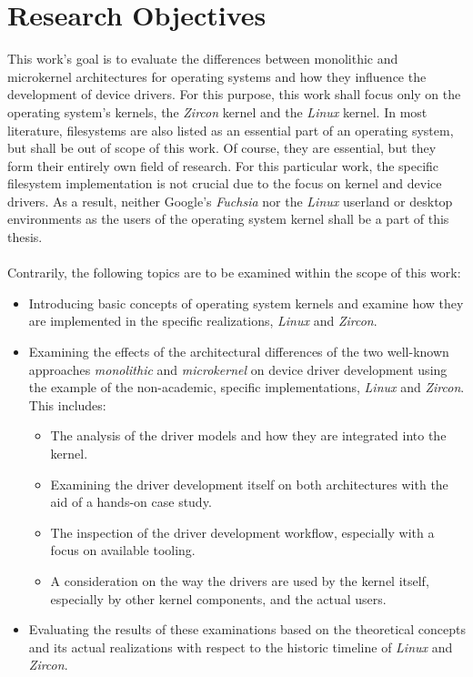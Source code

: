 \section{Research Objectives}\label{sec:research-objectives}
This work's goal is to evaluate the differences between monolithic and microkernel architectures for operating systems and how they influence the development of device drivers.
For this purpose, this work shall focus only on the operating system's kernels, the \textit{Zircon} kernel and the \textit{Linux} kernel.
In most literature, filesystems are also listed as an essential part of an operating system, but shall be out of scope of this work.
Of course, they are essential, but they form their entirely own field of research.
For this particular work, the specific filesystem implementation is not crucial due to the focus on kernel and device drivers.
As a result, neither Google's \textit{Fuchsia} nor the \textit{Linux} userland or desktop environments as the users of the operating system kernel shall be a part of this thesis.\\
\\
Contrarily, the following topics are to be examined within the scope of this work:
\begin{itemize}
    \item Introducing basic concepts of operating system kernels and examine how they are implemented in the specific realizations, \textit{Linux} and \textit{Zircon}.
    \item Examining the effects of the architectural differences of the two well-known approaches \textit{monolithic} and \textit{microkernel} on device driver development using the example of the non-academic, specific implementations, \textit{Linux} and \textit{Zircon}. This includes:  
        \begin{itemize}
            \item The analysis of the driver models and how they are integrated into the kernel.
            \item Examining the driver development itself on both architectures with the aid of a hands-on case study.
            \item The inspection of the driver development workflow, especially with a focus on available tooling. 
            \item A consideration on the way the drivers are used by the kernel itself, especially by other kernel components, and the actual users.
        \end{itemize}
    \item Evaluating the results of these examinations based on the theoretical concepts and its actual realizations with respect to the historic timeline of \textit{Linux} and \textit{Zircon}.
\end{itemize}

